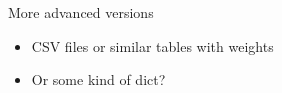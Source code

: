 \documentclass{beamer}
\begin{document}
\begin{frame}{More advanced versions}
	\begin{itemize}
		\item CSV files or similar tables with weights
		\item Or some kind of dict?
	\end{itemize}
\end{frame}

{
	\begin{frame}[plain]
	\end{frame}
	\begin{frame}[plain]
	\end{frame}
}
\end{document}
